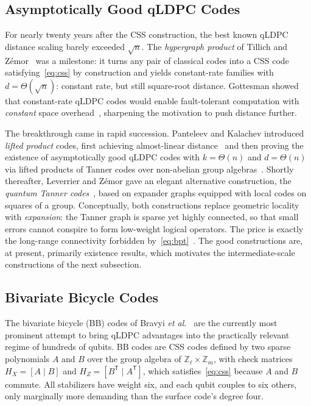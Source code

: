 \documentclass[a4paper,11pt]{quantumarticle}
\theoremstyle{definition}
\begin{document}
\subsection{Asymptotically Good qLDPC Codes}
\label{sec:good}
For nearly twenty years after the CSS construction, the best known qLDPC
distance scaling barely exceeded $\sqrt{n}$. The \emph{hypergraph product} of
Tillich and Z\'emor~\cite{tillich2014} was a milestone: it turns any pair of
classical codes into a CSS code satisfying~\eqref{eq:css} by construction and
yields constant-rate families with $d = \Theta(\sqrt{n})$: constant rate,
but still square-root distance. Gottesman showed that constant-rate qLDPC
codes would enable fault-tolerant computation with \emph{constant} space
overhead~\cite{gottesman2014}, sharpening the motivation to push distance
further.

The breakthrough came in rapid succession. Panteleev and Kalachev introduced
\emph{lifted product} codes, first achieving almost-linear
distance~\cite{panteleev2021distance} and then proving the existence of
asymptotically good qLDPC codes with $k = \Theta(n)$ and $d = \Theta(n)$
via lifted products of Tanner codes over non-abelian group
algebras~\cite{panteleev2022good}. Shortly thereafter, Leverrier and Z\'emor
gave an elegant alternative construction, the \emph{quantum Tanner
codes}~\cite{leverrier2022}, based on expander graphs equipped with local
codes on squares of a group. Conceptually, both constructions replace
geometric locality with \emph{expansion}: the Tanner graph is sparse yet
highly connected, so that small errors cannot conspire to form low-weight
logical operators. The price is exactly the long-range connectivity
forbidden by~\eqref{eq:bpt}~\cite{baspin2022}. The good constructions are,
at present, primarily existence results, which motivates the
intermediate-scale constructions of the next subsection.

\subsection{Bivariate Bicycle Codes}
\label{sec:bb}
The bivariate bicycle (BB) codes of Bravyi \emph{et
al.}~\cite{bravyi2024} are the currently most prominent attempt to bring
qLDPC advantages into the practically relevant regime of hundreds of qubits.
BB codes are CSS codes defined by two sparse polynomials $A$ and $B$ over the
group algebra of $\mathbb{Z}_\ell \times \mathbb{Z}_m$, with check matrices
$H_X = [A \mid B]$ and $H_Z = [B^{\mathsf{T}} \mid A^{\mathsf{T}}]$, which
satisfies~\eqref{eq:css} because $A$ and $B$ commute. All stabilizers have
weight six, and each qubit couples to six others, only marginally more
demanding than the surface code's degree four.
\end{document}
